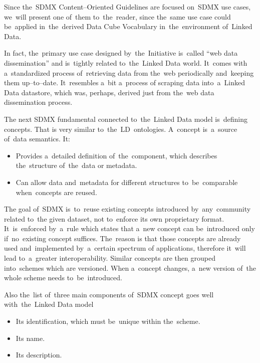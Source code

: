 Since the~SDMX Content--Oriented Guidelines are focused on~SDMX use cases, we~will present
one of~them to~the~reader, since the~same use case could be~applied in~the~derived Data Cube
Vocabulary in~the~environment of~Linked Data.

In fact, the~primary use case designed by~the~Initiative is~called “web data dissemination”
and is~tightly related to~the~Linked Data world. It~comes with a~standardized process of~retrieving
data from the~web periodically and~keeping them up--to--date. It~resembles a~bit a~process
of scraping data into~a~Linked Data datastore, which was, perhaps, derived just from the~web
data dissemination process.

The next SDMX fundamental connected to~the~Linked Data model is~defining concepts. That is
very similar to~the~LD~ontologies. A~concept is~a~source of~data semantics. It:

\begin{itemize}
\item Provides a~detailed definition of~the~component, which describes the~structure of~the~data or
metadata.
\item Can allow data and~metadata for different structures to~be~comparable when~concepts are reused.
\end{itemize}

The goal of~SDMX is~to~reuse existing concepts introduced by~any~community related to~the
given dataset, not to~enforce its own proprietary format. It~is~enforced by~a~rule which states
that a~new concept can be~introduced only if~no~existing concept suffices. The~reason
is that those concepts are already used and~implemented by~a~certain spectrum of
applications, therefore it~will lead to~a~greater interoperability. Similar concepts are then
grouped into~schemes which are versioned. When a~concept changes, a~new version of~the
whole scheme needs to~be~introduced.

\begin{sloppypar}
Also the~list of~three main components of~SDMX concept goes well with~the~Linked Data model
\end{sloppypar}

\begin{itemize}
\item Its identification, which must be~unique within the~scheme.
\item Its name.
\item Its description.
\end{itemize}

